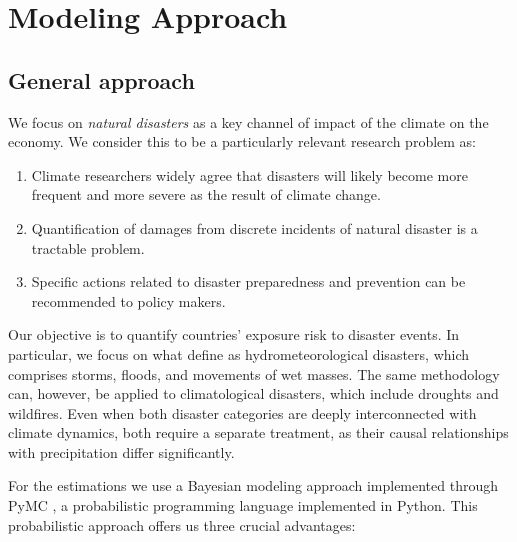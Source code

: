 
\section{Modeling Approach}
\label{sec:modeling_approach}

\subsection{General approach}

We focus on \textit{natural disasters} as a key channel of impact of the climate on the economy. We consider this to be a particularly relevant research problem as:

\begin{enumerate}
    \item Climate researchers widely agree that disasters will likely become more frequent and more severe as the result of climate change.
    \item Quantification of damages from discrete incidents of natural disaster is a tractable problem.
    \item Specific actions related to disaster preparedness and prevention can be recommended to policy makers.
\end{enumerate}

Our objective is to quantify countries' exposure risk to disaster events. In particular, we focus on what \citet{lopez_climate_2015} define as hydrometeorological disasters, which comprises storms, floods, and movements of wet masses. The same methodology can, however, be applied to climatological disasters, which include droughts and wildfires. Even when both disaster categories are deeply interconnected with climate dynamics, both require a separate treatment, as their causal relationships with precipitation differ significantly.

For the estimations we use a Bayesian modeling approach implemented through PyMC \citep{abril2023pymc}, a probabilistic programming language implemented in Python. This probabilistic approach offers us three crucial advantages:

